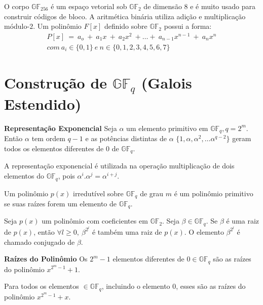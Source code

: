 O corpo $\mathbb{GF}_{256}$ é um espaço vetorial sob $\mathbb{GF}_2$ de dimensão $8$ e é muito usado para construir códigos de bloco. A aritmética
binária utiliza adição e multiplicação módulo-$2$. Um polinômio $F[x]$ definido sobre $\mathbb{GF}_2$ possui a forma:
\begin{align*}
P[x]\ =\ a_o\ +\ a_1x\ +\ a_2x^2\ + \ldots +\ a_{n-1}x^{n-1}\ +\ a_nx^n\\
com\ a_i \in \{0, 1\}\ e\ n \in \{0, 1, 2, 3, 4, 5, 6, 7\}
\end{align*}


\section{Construção de $\mathbb{GF}_q$ (Galois Estendido)}

\begin{definition} {\bf Representação Exponencial} \label{RepExp}  Seja $\alpha$ um elemento primitivo em $\mathbb{GF}_q, q=2^m$. Então $\alpha$ tem ordem $q -1$ e as potências distintas de $\alpha$ $\{ 1, \alpha, \alpha^2, \ldots \alpha^{q-2}\}$ geram todos os elementos diferentes de $0$ de $\mathbb{GF}_q$.

A representação exponencial é utilizada na operação multiplicação de dois elementos do $\mathbb{GF}_q$, pois $\alpha^i.\alpha^j=\alpha^{i+j}$.

\end{definition}

\begin{definition} Um polinômio $p(x)$ irredutível sobre $\mathbb{GF}_q$ de grau $m$ é um polinômio primitivo se suas raízes forem um elemento de $\mathbb{GF}_q$.
\end{definition}

\begin{definition} Seja $p(x)$ um polinômio com coeficientes em $\mathbb{GF}_2$. Seja $\beta \in \mathbb{GF}_q$. Se $\beta$ é uma raiz de $p(x)$, então $\forall l \geq 0,\ \beta^{2^{l}}$ é também uma raiz de $p(x)$. O elemento $\beta^{2^{l}}$ é chamado conjugado de $\beta$.
\end{definition}

\begin{theorem} {\bf Raízes do Polinômio} \label{RaiPol}  Os $2^m -1$ elementos diferentes de $0 \in \mathbb{GF}_q$ são as raízes do polinômio $x^{2^{m}-1} + 1$.
\end{theorem}

\begin{corollary} Para todos os elementos $ \in \mathbb{GF}_q$, incluindo o elemento $0$, esses são as raízes do polinômio $x^{2^{m}-1} + x$.
\end{corollary}

